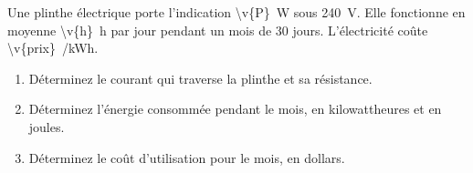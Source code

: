 Une plinthe électrique porte l'indication \qty{\v{P}}{W} sous \qty{240}{V}. Elle fonctionne en moyenne \qty{\v{h}}{h} par jour pendant un mois de \num{30} jours. L'électricité coûte \qty{\v{prix}}{/kWh}.

\begin{enumerate}[label=\alph*)]
    \item Déterminez le courant qui traverse la plinthe et sa résistance.
    \item Déterminez l'énergie consommée pendant le mois, en kilowattheures et en joules.
    \item Déterminez le coût d'utilisation pour le mois, en dollars.
\end{enumerate}
